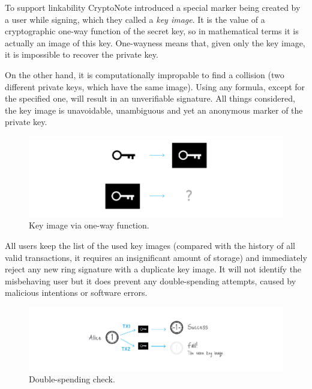 To support linkability CryptoNote introduced a special marker being created by a user while signing, which they called a \emph{key image}. It is the value of a cryptographic one-way function of the secret key, so in mathematical terms it is actually an image of this key. One-wayness means that, given only the key image, it is impossible to recover the private key.

On the other hand, it is computationally impropable to find a collision (two different private keys, which have the same image). Using any formula, except for the specified one, will result in an unverifiable signature. All things considered, the key image is unavoidable, unambiguous and yet an anonymous marker of the private key.
\vspace{0.3cm}
\begin{figure}[H]
  \centering
  \includegraphics[width=1 \columnwidth,keepaspectratio]{Images/CryptoNote/key_image.png}
  \caption{Key image via one-way function.~\cite{cryptonote}}
  \label{fig:key_image}
\end{figure}
\vspace{0.2cm}

All users keep the list of the used key images (compared with the history of all valid transactions, it requires an insignificant amount of storage) and immediately reject any new ring signature with a duplicate key image. It will not identify the misbehaving user but it does prevent any double-spending attempts, caused by malicious intentions or software errors.
\begin{figure}[H]
  \centering
  \includegraphics[width=1.2 \columnwidth,keepaspectratio]{Images/CryptoNote/double_spending.png}
  \caption{Double-spending check.~\cite{cryptonote}}
  \label{fig:double_spending}
\end{figure}
\vspace{0.2cm}

